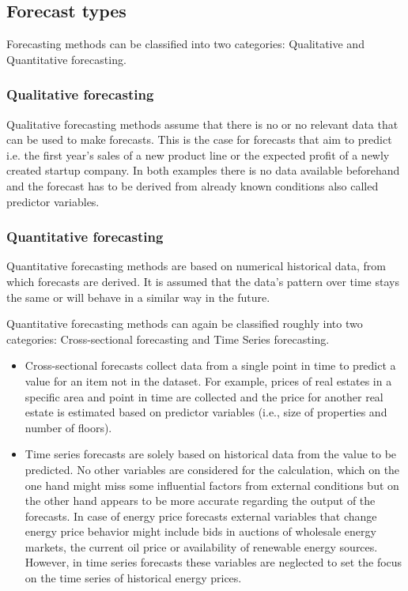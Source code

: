 \subsection{Forecast types}


Forecasting methods can be classified into two categories: Qualitative and Quantitative forecasting. 

\subsubsection{Qualitative forecasting}
Qualitative forecasting methods assume that there is no or no relevant data that can be used to make forecasts. This is the case for forecasts that aim to predict i.e. the first year's sales of a new product line or the expected profit of a newly created startup company. In both examples there is no data available beforehand and the forecast has to be derived from already known conditions also called predictor variables. 

\subsubsection{Quantitative forecasting}
Quantitative forecasting methods are based on numerical historical data, from which forecasts are derived. It is assumed that the data's pattern over time stays the same or will behave in a similar way in the future. 

Quantitative forecasting methods can again be classified roughly into two categories: Cross-sectional forecasting and Time Series forecasting.

\begin{itemize}

\item Cross-sectional forecasts collect data from a single point in time to predict a value for an item not in the dataset. For example, prices of real estates in a specific area and point in time are collected and the price for another real estate is estimated based on predictor variables (i.e., size of properties and number of floors). 

\item Time series forecasts are solely based on historical data from the value to be predicted. No other variables are considered for the calculation, which on the one hand might miss some influential factors from external conditions but on the other hand appears to be more accurate regarding the output of the forecasts. 
In case of energy price forecasts external variables that change energy price behavior might include bids in auctions of wholesale energy markets, the current oil price or availability of renewable energy sources. However, in time series forecasts these variables are neglected to set the focus on the time series of historical energy prices. 

\end{itemize}


